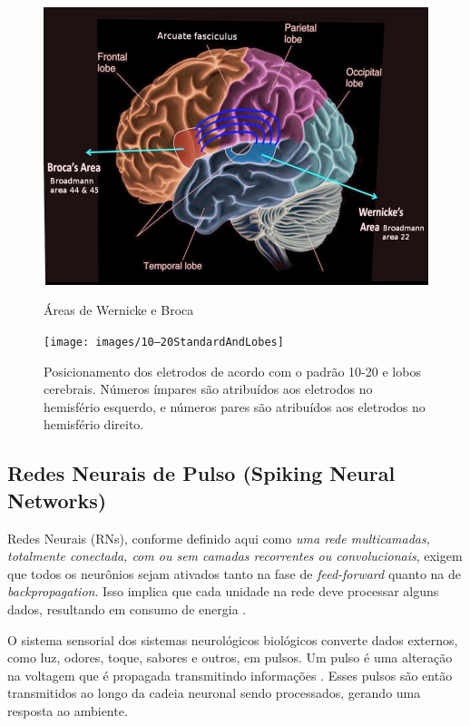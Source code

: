 			\begin{figure}[H]
				\centering
				\caption[Áreas de Wernicke e Broca]{Áreas de Wernicke e Broca}
				\includegraphics[width=0.7\linewidth]{images/wernickesAndBrocasAreas}
				\label{fig:wernickesandbrocasareas}
			\end{figure}
			
			\begin{figure}[H]
				\centering
				\caption[Sistema 10-20 e lobos cerebrais]{Posicionamento dos eletrodos de acordo com o padrão 10-20 e lobos cerebrais. Números ímpares são atribuídos aos eletrodos no hemisfério esquerdo, e números pares são atribuídos aos eletrodos no hemisfério direito.}
				\texttt{[image: images/10–20StandardAndLobes]}
				\label{fig:1020standardandlobes}
			\end{figure}
		
		\subsection{Redes Neurais de Pulso (Spiking Neural Networks)}
			
			\par Redes Neurais (RNs), conforme definido aqui como \textit{uma rede multicamadas, totalmente conectada, com ou sem camadas recorrentes ou convolucionais}, exigem que todos os neurônios sejam ativados tanto na fase de \textit{feed-forward} quanto na de \textit{backpropagation}. Isso implica que cada unidade na rede deve processar alguns dados, resultando em consumo de energia \cite{10242251}.
			
			\par O sistema sensorial dos sistemas neurológicos biológicos converte dados externos, como luz, odores, toque, sabores e outros, em pulsos. Um pulso é uma alteração na voltagem que é propagada transmitindo informações \cite{kasabov2019time}. Esses pulsos são então transmitidos ao longo da cadeia neuronal sendo processados, gerando uma resposta ao ambiente.
			
